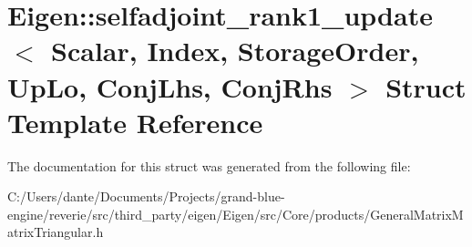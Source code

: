 \hypertarget{struct_eigen_1_1selfadjoint__rank1__update}{}\section{Eigen\+::selfadjoint\+\_\+rank1\+\_\+update$<$ Scalar, Index, Storage\+Order, Up\+Lo, Conj\+Lhs, Conj\+Rhs $>$ Struct Template Reference}
\label{struct_eigen_1_1selfadjoint__rank1__update}


The documentation for this struct was generated from the following file\+:\begin{DoxyCompactItemize}
\item 
C\+:/\+Users/dante/\+Documents/\+Projects/grand-\/blue-\/engine/reverie/src/third\+\_\+party/eigen/\+Eigen/src/\+Core/products/General\+Matrix\+Matrix\+Triangular.\+h\end{DoxyCompactItemize}
